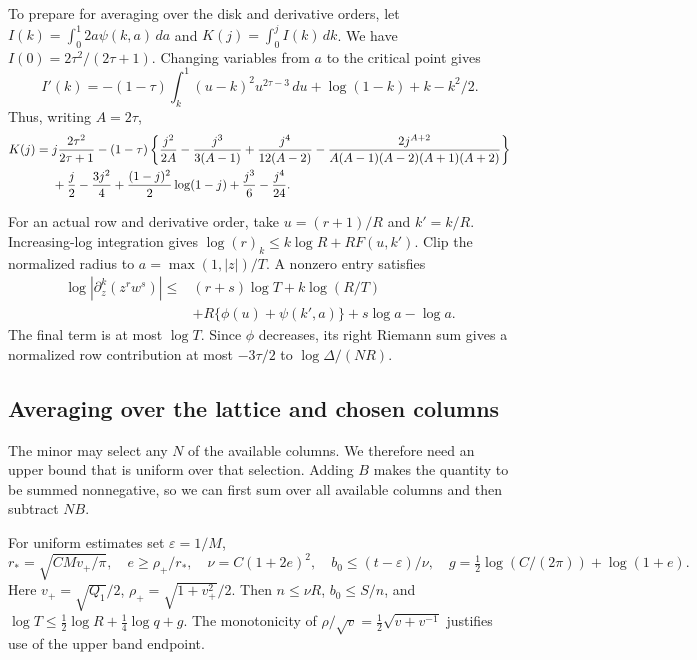 \documentclass[11pt]{article}
\begin{document}
To prepare for averaging over the disk and derivative orders, let
\(I(k)=\int_0^1 2a\psi(k,a)\,da\) and
\(K(j)=\int_0^j I(k)\,dk\). We have \(I(0)=2\tau^2/(2\tau+1)\).
Changing variables from \(a\) to the critical point gives
\[
 I'(k)=-(1-\tau)\int_k^1(u-k)^2u^{2\tau-3}\,du
               +\log(1-k)+k-k^2/2.
\]
Thus, writing \(A=2\tau\),
\begin{align}\label{Kformula}
 K(j)={}&j\frac{2\tau^2}{2\tau+1}
 -(1-\tau)\left\{\frac{j^2}{2A}-\frac{j^3}{3(A-1)}
 +\frac{j^4}{12(A-2)}
 -\frac{2j^{A+2}}{A(A-1)(A-2)(A+1)(A+2)}\right\}\\
 &+\frac j2-\frac{3j^2}4+\frac{(1-j)^2}2\log(1-j)
        +\frac{j^3}6-\frac{j^4}{24}.
 \notag
\end{align}

For an actual row and derivative order, take \(u=(r+1)/R\) and
\(k'=k/R\). Increasing-log integration gives
\(\log(r)_k\le k\log R+RF(u,k')\).
Clip the normalized radius to \(a=\max(1,|z|)/T\). A nonzero entry
satisfies
\begin{align*}
 \log|\partial_z^k(z^rw^s)|\le{}&
 (r+s)\log T+k\log(R/T)\\
 &+R\{\phi(u)+\psi(k',a)\}+s\log a-\log a.
\end{align*}
The final term is at most \(\log T\). Since \(\phi\) decreases, its
right Riemann sum gives a normalized row contribution at most
\(-3\tau/2\) to \(\log\Delta/(NR)\).

\subsection{Averaging over the lattice and chosen columns}\label{arch-averaging}
The minor may select any \(N\) of the available columns. We therefore
need an upper bound that is uniform over that selection. Adding \(B\)
makes the quantity to be summed nonnegative, so we can first sum over
all available columns and then subtract \(NB\).

For uniform estimates set \(\varepsilon=1/M\),
\begin{equation}\label{geometry}
 r_* =\sqrt{CMv_+/\pi},\quad e\ge\rho_+/r_*,\quad
 \nu=C(1+2e)^2,\quad b_0\le(t-\varepsilon)/\nu,
 \quad g=\tfrac12\log(C/(2\pi))+\log(1+e).
\end{equation}
Here \(v_+=\sqrt{Q_1}/2\), \(\rho_+=\sqrt{1+v_+^2}/2\).
Then \(n\le\nu R\), \(b_0\le S/n\), and
\(\log T\le\frac12\log R+\frac14\log q+g\).
The monotonicity of \(\rho/\sqrt v=\frac12\sqrt{v+v^{-1}}\)
justifies use of the upper band endpoint.
\end{document}
